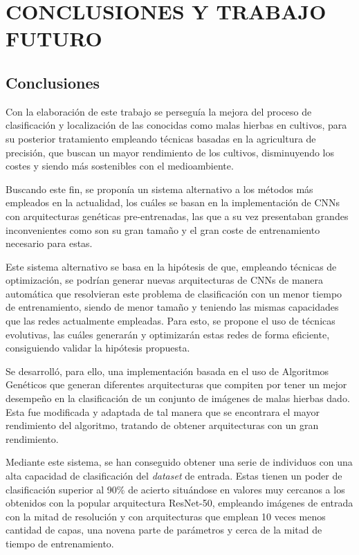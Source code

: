 %
\chapter{CONCLUSIONES Y TRABAJO FUTURO}
\label{sec:conclusiones}

\section{Conclusiones}

Con la elaboración de este trabajo se perseguía la mejora del proceso de clasificación y localización de las conocidas como malas hierbas en cultivos, para su posterior tratamiento empleando técnicas basadas en la agricultura de precisión, que buscan un mayor rendimiento de los cultivos, disminuyendo los costes y siendo más sostenibles con el medioambiente.

Buscando este fin, se proponía un sistema alternativo a los métodos más empleados en la actualidad, los cuáles se basan en la implementación de CNNs con arquitecturas genéticas pre-entrenadas, las que a su vez presentaban grandes inconvenientes como son su gran tamaño y el gran coste de entrenamiento necesario para estas.

Este sistema alternativo se basa en la hipótesis de que, empleando técnicas de optimización, se podrían generar nuevas arquitecturas de CNNs de manera automática que resolvieran este problema de clasificación con un menor tiempo de entrenamiento, siendo de menor tamaño y teniendo las mismas capacidades que las redes actualmente empleadas. Para esto, se propone el uso de técnicas evolutivas, las cuáles generarán y optimizarán estas redes de forma eficiente, consiguiendo validar la hipótesis propuesta.

Se desarrolló, para ello, una implementación basada en el uso de Algoritmos Genéticos que generan diferentes arquitecturas que compiten por tener un mejor desempeño en la clasificación de un conjunto de imágenes de malas hierbas dado. Esta fue modificada y adaptada de tal manera que se encontrara el mayor rendimiento del algoritmo, tratando de obtener arquitecturas con un gran rendimiento.

Mediante este sistema, se han conseguido obtener una serie de individuos con una alta capacidad de clasificación del \textit{dataset} de entrada. Estas tienen un poder de clasificación superior al 90\% de acierto situándose en valores muy cercanos a los obtenidos con la popular arquitectura ResNet-50, empleando imágenes de entrada con la mitad de resolución y con arquitecturas que emplean 10 veces menos cantidad de capas, una novena parte de parámetros y cerca de la mitad de tiempo de entrenamiento.

